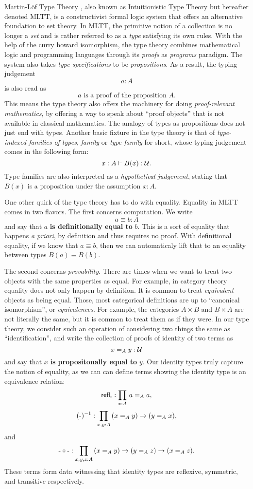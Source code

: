 \documentclass[main.tex]{subfiles}
\begin{document}
Martin-L\"of Type Theory \cite{martin1984intuitionistic}, also known as Intuitionistic Type Theory but hereafter denoted MLTT, is a constructivist formal logic system that offers an alternative foundation to set theory. In MLTT, the primitive notion of a collection is no longer a \textit{set} and is rather referred to as a \textit{type} satisfying its own rules. With the help of the curry howard isomorphism, the type theory combines mathematical logic and programming languages through its \textit{proofs} as \textit{programs} paradigm. The system also takes \textit{type specifications} to be \textit{propositions}. As a result, the typing judgement 
\[ a : A \]
is also read as
\[
a \text{ is a proof of the proposition } A.
\]
This means the type theory also offers the machinery for doing \textit{proof-relevant mathematics}, by offering a way to speak about ``proof objects'' that is not available in classical mathematics. The analogy of types as propositions does not just end with types. Another basic fixture in the type theory is that of \textit{type-indexed families of types}, \textit{family} or \textit{type family} for short, whose typing judgement comes in the following form:
\[
x : A \vdash B (x) : \mathcal{U}.
\]
Type families are also interpreted as a \textit{hypothetical judgement}, stating that $B(x)$ is a proposition under the assumption $x:A$. 

One other quirk of the type theory has to do with equality. Equality in MLTT comes in two flavors. The first concerns computation. We write \[ a \equiv b : A\] and say that $a$ \textbf{is definitionally equal to} $b$. This is a sort of equality that happens \textit{a priori}, by definition and thus requires no proof. With definitional equality, if we know that $a \equiv b$, then we can automaticaly lift that to an equality between types $B(a) \equiv B(b)$. 

The second concerns \textit{provability}. There are times when we want to treat two objects with the same properties as equal. For example, in category theory equality does not only happen by definition. It is common to treat \textit{equivalent} objects as being equal. Those, most categorical definitions are up to ``canonical isomorphism'', or \textit{equivalences}. For example, the categories $A \times B$ and $B \times A$ are not literally the same, but it is common to treat them as if they were. In our type theory, we consider such an operation of considering two things the same as ``identification'',  and write the collection of proofs of identity of two terms as \[x=_A y : \mathcal{U}\]
and say that $x$ \textbf{is propositonally equal to} $y$. Our identity types truly capture the notion of equality, as we can can define terms showing the identity type is an equivalence relation:
 $$\refl{\text-} : \prd{x:A}a=_A a,$$ $$(\text-)^{-1}:\prd{x,y:A}(x =_A y ) \to (y =_A x),$$ and  $$\text-\circ\text- : \prd{x,y,z : A} (x =_A y) \to (y =_A z) \to (x =_A z).$$
These terms form data witnessing that identity types are reflexive, symmetric, and transitive respectively.
\end{document}
